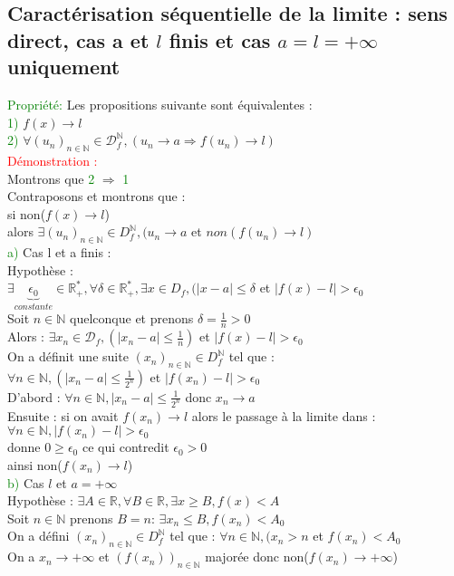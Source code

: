 \documentclass{article}
\begin{document}
\subsection{Caractérisation séquentielle de la limite : sens direct, cas a et $l$ finis et cas $a=l=+ \infty$ uniquement}
\textcolor{green}{Propriété:} Les propositions suivante sont équivalentes : \\ 
\textcolor{green}{1)} $f(x) \rightarrow l$ \\ 
\textcolor{green}{2)} $\forall (u_n)_{n \in \mathbb{N}} \in \mathcal{D}^\mathbb{N}_f,(u_n \rightarrow a \Rightarrow f(u_n) \rightarrow l)$ \\ 
\textcolor{red}{Démonstration :} \\ 
Montrons que \textcolor{green}{2} $\Rightarrow$ \textcolor{green}{1} \\ 
Contraposons et montrons que : \\ 
si non($f(x) \rightarrow l$) \\ 
alors $\exists (u_n)_{n \in \mathbb{N}}\in D_f^\mathbb{N},(u_n \rightarrow a$ et $non(f(u_n)\rightarrow l)$ \\ 
\textcolor{green}{a)} Cas l et a finis : \\ 
Hypothèse : \\ 
$\exists \underbrace{\epsilon_0}_{constante} \in \mathbb{R}^*_+, \forall \delta \in \mathbb{R}^*_+, \exists x \in D_f,(|x-a| \leq \delta$ et $|f(x)-l|> \epsilon_0$ \\ 
Soit $n \in \mathbb{N}$ quelconque et prenons $\delta= \frac{1}{n}>0$ \\ 
Alors : $\exists x_n \in \mathcal{D}_f,(|x_n-a| \leq \frac{1}{n})$ et $|f(x)-l|> \epsilon_0$ \\ 
On a définit une suite $(x_n)_{n\in \mathbb{N}} \in D_f^\mathbb{N}$ tel que : \\ 
$\forall n \in \mathbb{N},(|x_n-a|\leq \frac{1}{2^n})$ et $|f(x_n)-l|>\epsilon_0$ \\ 
D'abord : $\forall n \in \mathbb{N},|x_n-a| \leq \frac{1}{2^n}$ donc $x_n \rightarrow a$ \\ 
Ensuite : si on avait $f(x_n) \rightarrow l$ alors le passage à la limite dans : \\ 
$\forall n \in \mathbb{N},|f(x_n)-l|>\epsilon_0$ \\ 
donne $0 \geq \epsilon_0$ ce qui contredit $\epsilon_0 > 0$ \\ 
ainsi non($f(x_n) \rightarrow l$) \\ 
\textcolor{green}{b)} Cas $l$ et $a=+ \infty$ \\ 
Hypothèse : $\exists A \in \mathbb{R}, \forall B \in \mathbb{R}, \exists x \geq B, f(x)<A$ \\ 
Soit $n \in \mathbb{N}$ prenons $B=n$: $\exists x_n \leq B, f(x_n)< A_0$ \\ 
On a défini $(x_n)_{n \in \mathbb{N}}\in D_f^\mathbb{N}$ tel que : $\forall n \in \mathbb{N},(x_n >n$ et $f(x_n)< A_0$ \\ 
On a $x_n \rightarrow + \infty$ et $(f(x_n))_{n\in \mathbb{N}}$ majorée donc non($f(x_n) \rightarrow + \infty$)
\end{document}
